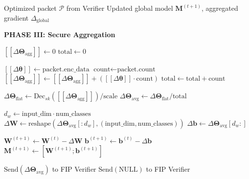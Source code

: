 \documentclass[10pt,journal,compsoc]{IEEEtran}
\begin{document}
\begin{algorithm}[H]
\caption{FIP-FL Per-Round Verification Protocol (Part 4: Secure Aggregation)}
\label{alg:round4}
\begin{algorithmic}[1]
\Require Optimized packet $\mathcal{P}$ from Verifier
\Ensure Updated global model $\mathbf{M}^{(t+1)}$, aggregated gradient $\Delta_{\text{global}}$

\Statex \textbf{PHASE III: Secure Aggregation}

    \State $[\![\Delta \bm{\Theta}_{\text{agg}}]\!] \gets 0$
    \State $\text{total} \gets 0$
    
        \State $[\![\Delta \bm{\theta}]\!] \gets \text{packet.enc\_data}$
        \State $\text{count} \gets \text{packet.count}$
        \State $[\![\Delta \bm{\Theta}_{\text{agg}}]\!] \gets [\![\Delta \bm{\Theta}_{\text{agg}}]\!] + ([\![\Delta \bm{\theta}]\!] \cdot \text{count})$
        \State $\text{total} \gets \text{total} + \text{count}$
    \EndFor
    
    \State $\Delta \bm{\Theta}_{\text{flat}} \gets \text{Dec}_{sk}([\![\Delta \bm{\Theta}_{\text{agg}}]\!]) / \text{scale}$
    \State $\Delta \bm{\Theta}_{\text{avg}} \gets \Delta \bm{\Theta}_{\text{flat}} / \text{total}$
    
    \State $d_w \gets \text{input\_dim} \cdot \text{num\_classes}$
    \State $\Delta \mathbf{W} \gets \text{reshape}(\Delta \bm{\Theta}_{\text{avg}}[:d_w], (\text{input\_dim}, \text{num\_classes}))$
    \State $\Delta \mathbf{b} \gets \Delta \bm{\Theta}_{\text{avg}}[d_w:]$
    
    \State $\mathbf{W}^{(t+1)} \gets \mathbf{W}^{(t)} - \Delta \mathbf{W}$
    \State $\mathbf{b}^{(t+1)} \gets \mathbf{b}^{(t)} - \Delta \mathbf{b}$
    \State $\mathbf{M}^{(t+1)} \gets [\mathbf{W}^{(t+1)}; \mathbf{b}^{(t+1)}]$
    
    \State $\text{Send}(\Delta \bm{\Theta}_{\text{avg}})$ to FIP Verifier
\Else
    \State $\text{Send}(\text{NULL})$ to FIP Verifier
\EndIf
\end{algorithmic}
\end{algorithm}
\end{document}
